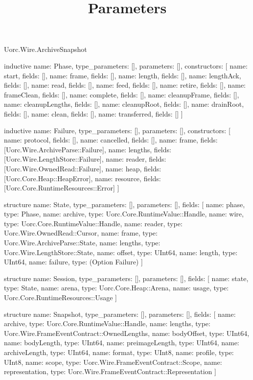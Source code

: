 \begin{lexlean}{Uorc.Wire.ArchiveSnapshot}
\title{Parameters}
\begin{semanticmodule}
inductive{
  name: Phase,
  type_parameters: [],
  parameters: [],
  constructors: [
    {name: start, fields: []},
    {name: frame, fields: []},
    {name: length, fields: []},
    {name: lengthAck, fields: []},
    {name: read, fields: []},
    {name: feed, fields: []},
    {name: retire, fields: []},
    {name: frameClean, fields: []},
    {name: complete, fields: []},
    {name: cleanupFrame, fields: []},
    {name: cleanupLengths, fields: []},
    {name: cleanupRoot, fields: []},
    {name: drainRoot, fields: []},
    {name: clean, fields: []},
    {name: transferred, fields: []}
  ]
}

inductive{
  name: Failure,
  type_parameters: [],
  parameters: [],
  constructors: [
    {name: protocol, fields: []},
    {name: cancelled, fields: []},
    {name: frame, fields: [Uorc.Wire.ArchiveParse::Failure]},
    {name: lengths, fields: [Uorc.Wire.LengthStore::Failure]},
    {name: reader, fields: [Uorc.Wire.OwnedRead::Failure]},
    {name: heap, fields: [Uorc.Core.Heap::HeapError]},
    {name: resource, fields: [Uorc.Core.RuntimeResources::Error]}
  ]
}

structure{
  name: State,
  type_parameters: [],
  parameters: [],
  fields: [
    {name: phase, type: Phase},
    {name: archive, type: Uorc.Core.RuntimeValue::Handle},
    {name: wire, type: Uorc.Core.RuntimeValue::Handle},
    {name: reader, type: Uorc.Wire.OwnedRead::Cursor},
    {name: frame, type: Uorc.Wire.ArchiveParse::State},
    {name: lengths, type: Uorc.Wire.LengthStore::State},
    {name: offset, type: UInt64},
    {name: length, type: UInt64},
    {name: failure, type: (Option Failure)}
  ]
}

structure{
  name: Session,
  type_parameters: [],
  parameters: [],
  fields: [
    {name: state, type: State},
    {name: arena, type: Uorc.Core.Heap::Arena},
    {name: usage, type: Uorc.Core.RuntimeResources::Usage}
  ]
}

structure{
  name: Snapshot,
  type_parameters: [],
  parameters: [],
  fields: [
    {name: archive, type: Uorc.Core.RuntimeValue::Handle},
    {name: lengths, type: Uorc.Wire.FrameEventContract::OwnedLengths},
    {name: bodyOffset, type: UInt64},
    {name: bodyLength, type: UInt64},
    {name: preimageLength, type: UInt64},
    {name: archiveLength, type: UInt64},
    {name: format, type: UInt8},
    {name: profile, type: UInt8},
    {name: scope, type: Uorc.Wire.FrameEventContract::Scope},
    {name: representation, type: Uorc.Wire.FrameEventContract::Representation}
  ]
}


\end{semanticmodule}
\end{lexlean}
